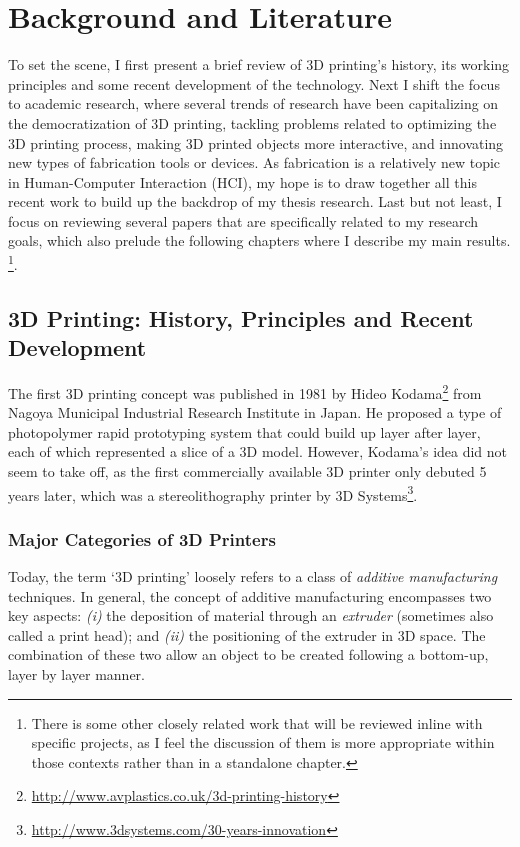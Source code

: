 \chapter{Background and Literature}
To set the scene, I first present a brief review of 3D printing's history, its working principles and some recent development of the technology. Next I shift the focus to academic research, where several trends of research have been capitalizing on the democratization of 3D printing, tackling problems related to optimizing the 3D printing process, making 3D printed objects more interactive, and innovating new types of fabrication tools or devices. As fabrication is a relatively new topic in Human-Computer Interaction (HCI), my hope is to draw together all this recent work to build up the backdrop of my thesis research. Last but not least, I focus on reviewing several papers that are specifically related to my research goals, which also prelude the following chapters where I describe my main results. \footnote{There is some other closely related work that will be reviewed inline with specific projects, as I feel the discussion of them is more appropriate within those contexts rather than in a standalone chapter.}.

\section{3D Printing: History, Principles and Recent Development}
The first 3D printing concept was published in 1981 by Hideo Kodama\footnote{\url{http://www.avplastics.co.uk/3d-printing-history}} from Nagoya Municipal Industrial Research Institute in Japan. He proposed a type of photopolymer rapid prototyping system that could build up layer after layer, each of which represented a slice of a 3D model. However, Kodama's idea did not seem to take off, as the first commercially available 3D printer only debuted 5 years later, which was a stereolithography printer by 3D Systems\footnote{\url{http://www.3dsystems.com/30-years-innovation}}.

\subsection{Major Categories of 3D Printers}
Today, the term `3D printing' loosely refers to a class of \textit{additive manufacturing} techniques\cite{gibson2010additive}. In general, the concept of additive manufacturing encompasses two key aspects: {\em (i)} the deposition of material through an \textit{extruder} (sometimes also called a print head); and {\em (ii)} the positioning of the extruder in 3D space. The combination of these two allow an object to be created following a bottom-up, layer by layer manner.


